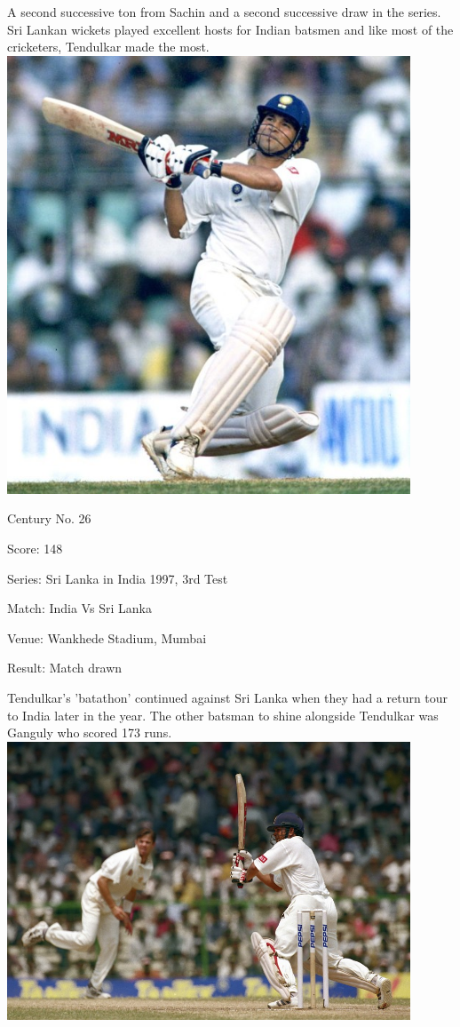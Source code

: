 \documentclass[11pt, a4paper]{article}
\begin{document}
A second successive ton from Sachin and a second successive draw in the series. Sri Lankan wickets played excellent hosts for Indian batsmen and like most of the cricketers, Tendulkar made the most.
\newpage
\includegraphics[width=0.9\textwidth]{pics/26.jpg}

Century No. 26

Score: 148

Series: Sri Lanka in India 1997, 3rd Test

Match: India Vs Sri Lanka

Venue: Wankhede Stadium, Mumbai

Result: Match drawn

Tendulkar's 'batathon' continued against Sri Lanka when they had a return tour to India later in the year. The other batsman to shine alongside Tendulkar was Ganguly who scored 173 runs.
\newpage
\includegraphics[width=0.9\textwidth]{pics/27.jpg}
\end{document}
